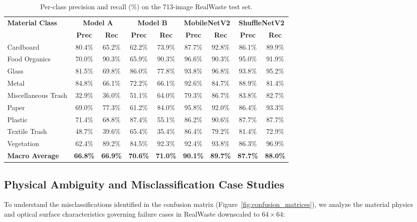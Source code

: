 \documentclass[11pt,a4paper]{article}
\begin{document}
\begin{table}[H]
  \centering
  \caption{Per-class precision and recall (\%) on the 713-image RealWaste test set.}
  \label{tab:per_class_table}
  \small
  \begin{tabular}{lcccccccc}
    \toprule
    \multirow{2}{*}{\textbf{Material Class}} & \multicolumn{2}{c}{\textbf{Model A}} & \multicolumn{2}{c}{\textbf{Model B}} & \multicolumn{2}{c}{\textbf{MobileNetV2}} & \multicolumn{2}{c}{\textbf{ShuffleNetV2}} \\
    \cmidrule(lr){2-3}\cmidrule(lr){4-5}\cmidrule(lr){6-7}\cmidrule(lr){8-9}
    & \textbf{Prec} & \textbf{Rec} & \textbf{Prec} & \textbf{Rec} & \textbf{Prec} & \textbf{Rec} & \textbf{Prec} & \textbf{Rec} \\
    \midrule
    Cardboard           & 80.4\% & 65.2\% & 62.2\% & 73.9\% & 87.7\% & 92.8\% & 86.1\% & 89.9\% \\
    Food Organics       & 70.0\% & 90.3\% & 65.9\% & 90.3\% & 96.6\% & 90.3\% & 95.0\% & 91.9\% \\
    Glass               & 81.5\% & 69.8\% & 86.0\% & 77.8\% & 93.8\% & 96.8\% & 93.8\% & 95.2\% \\
    Metal               & 84.8\% & 66.1\% & 72.2\% & 66.1\% & 92.6\% & 84.7\% & 88.9\% & 81.4\% \\
    Miscellaneous Trash & 32.9\% & 36.0\% & 51.1\% & 64.0\% & 79.3\% & 86.7\% & 83.8\% & 82.7\% \\
    Paper               & 69.0\% & 77.3\% & 61.2\% & 84.0\% & 95.8\% & 92.0\% & 86.4\% & 93.3\% \\
    Plastic             & 71.4\% & 68.8\% & 87.4\% & 55.1\% & 86.2\% & 90.6\% & 87.7\% & 87.7\% \\
    Textile Trash       & 48.7\% & 39.6\% & 65.4\% & 35.4\% & 86.4\% & 79.2\% & 81.4\% & 72.9\% \\
    Vegetation          & 62.4\% & 89.2\% & 84.5\% & 92.3\% & 92.4\% & 93.8\% & 86.3\% & 96.9\% \\
    \midrule
    \textbf{Macro Average} & \textbf{66.8\%} & \textbf{66.9\%} & \textbf{70.6\%} & \textbf{71.0\%} & \textbf{90.1\%} & \textbf{89.7\%} & \textbf{87.7\%} & \textbf{88.0\%} \\
    \bottomrule
  \end{tabular}
\end{table}

\subsection{Physical Ambiguity and Misclassification Case Studies}
To understand the misclassifications identified in the confusion matrix (Figure~\ref{fig:confusion_matrices}), we analyze the material physics and optical surface characteristics governing failure cases in RealWaste downscaled to $64 \times 64$:
\end{document}
